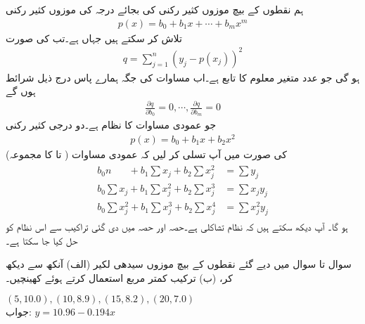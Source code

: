 ہم نقطوں کے بیچ موزوں کثیر رکنی  کی بجائے درجہ  کی موزوں کثیر رکنی
\begin{align*}
p(x)=b_0+b_1x+\cdots+b_mx^m
\end{align*}
تلاش کر سکتے ہیں جہاں  ہے۔تب  کی صورت 
\begin{align*}
q=\sum_{j=1}^{n}(y_j-p(x_j))^2
\end{align*}
ہو گی جو  عدد متغیر معلوم  کا تابع ہے۔اب مساوات  کی  جگہ ہمارے پاس درج ذیل  شرائط ہوں گے
\begin{align*}
\frac{\partial q}{\partial b_0}=0,\cdots,\frac{\partial q}{\partial b_m}=0
\end{align*}
جو   عمودی مساوات کا نظام ہے۔دو درجی کثیر رکنی
\begin{align}\label{مساوات_خطی_اعدادی_کمتر_مربع_شرائط_ت}
p(x)=b_0+b_1x+b_2x^2
\end{align}
 کی صورت میں آپ تسلی کر لیں کہ عمودی مساوات ( تا  کا مجموعہ)
\begin{gather}
\begin{aligned}\label{مساوات_خطی_اعدادی_کمتر_مربع_شرائط_ٹ}
b_0 n\phantom{\sum {}_j}+b_1\sum x_j+b_2\sum x_j^2&=\sum y_j\\[0.5ex]
b_0 \sum x_j +b_1\sum x_j^2 +b_2\sum x_j^3&=\sum x_jy_j\\[0.5ex]
b_0 \sum x_j^2+b_1\sum x_j^3+b_2\sum x_j^4&=\sum x_j^2y_j
\end{aligned}
\end{gather}
ہو گا۔ آپ دیکھ سکتے ہیں کہ نظام تشاکلی ہے۔حصہ  اور حصہ  میں دی گئی تراکیب سے اس نظام کو حل کیا جا سکتا ہے۔


سوال  تا سوال  میں دیے گئے نقطوں کے بیچ موزوں سیدھی لکیر (الف) آنکھ سے دیکھ کر، (ب)  ترکیب کمتر مربع استعمال کرتے ہوئے  کھینچیں۔ 

\quad
$(5,10.0), (10,8.9), (15,8.2), (20,7.0)$\\
جواب:\quad
$y=10.96-0.194x$

